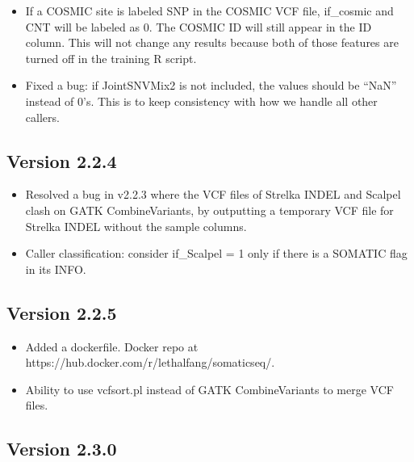 \documentclass[10pt,letterpaper]{article}
\begin{document}
\begin{sloppypar}
\begin{itemize}
  \item
  If a COSMIC site is labeled SNP in the COSMIC VCF file, if\_cosmic and CNT will be labeled as 0. The COSMIC ID will still appear in the ID column. This will not change any results because both of those features are turned off in the training R script.
  
  \item
  Fixed a bug: if JointSNVMix2 is not included, the values should be ``NaN'' instead of 0's. This is to keep consistency with how we handle all other callers.
  
\end{itemize}



\subsection{Version 2.2.4}

\begin{itemize}

  \item
  Resolved a bug in v2.2.3 where the VCF files of Strelka INDEL and Scalpel clash on GATK CombineVariants, by outputting a temporary VCF file for Strelka INDEL without the sample columns.
  
  \item
  Caller classification: consider if\_Scalpel = 1 only if there is a SOMATIC flag in its INFO. 

\end{itemize}


\subsection{Version 2.2.5}

\begin{itemize}
  
  \item
  Added a dockerfile. Docker repo at https://hub.docker.com/r/lethalfang/somaticseq/. 
  
  \item
  Ability to use vcfsort.pl instead of GATK CombineVariants to merge VCF files.

\end{itemize}


\subsection{Version 2.3.0}


\end{sloppypar}
\end{document}
